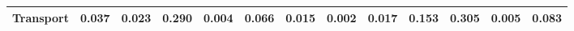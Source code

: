 \begin{table}[htbp]
\begin{tabular}{lcccccccccccc}
  Transport & \textcolor[RGB]{143,93,112}{0.037} & \textcolor[RGB]{163,105,92}{0.023} & \textcolor[RGB]{21,14,234}{0.290} & \textcolor[RGB]{228,148,27}{0.004} & \textcolor[RGB]{101,65,154}{0.066} & \textcolor[RGB]{191,124,64}{0.015} & \textcolor[RGB]{237,154,18}{0.002} & \textcolor[RGB]{184,119,71}{0.017} & \textcolor[RGB]{28,18,227}{0.153} & \textcolor[RGB]{16,10,239}{0.305} & \textcolor[RGB]{220,142,35}{0.005} & \textcolor[RGB]{80,52,175}{0.083} \\ 
   \hline
\end{tabular}
\end{table}
